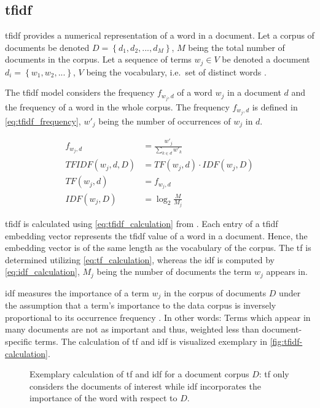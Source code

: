 \subsection{\acl*{tfidf}}\label{subsec:tfidf}

\acf{tfidf} provides a numerical representation of a word in a document.
Let a corpus of documents be denoted $D= \left\{d_1, d_2, ..., d_M  \right\}$, $M$ being the total number of documents in the corpus. 
Let a sequence of terms $w_{j} \in V$ be denoted a document $d_i = \left\{w_{1}, w_{2}, ...\right\}$, 
$V$ being the vocabulary, 
i.e.\ set of distinct words \cite{clusteringDocs2020}.

The \ac{tfidf} model considers the frequency $f_{w_{j}, d}$  of a word $w_{j}$ in a document $d$ and the frequency of a word in the whole corpus. 
The frequency $f_{w_{j}, d}$ is defined in \autoref{eq:tfidf_frequency}, $w'_j$ being the number of occurrences of $w_j$ in $d$.

\begin{align}
    f_{w_{j}, d} &= \frac{w'_{j}}{\sum_{k \in d} w'_k}\label{eq:tfidf_frequency}\\
    TFIDF(w_{j}, d, D) &= TF(w_{j}, d) \cdot IDF(w_{j}, D)\label{eq:tfidf_calculation}\\
    TF(w_{j}, d) &= f_{w_{j}, d}\label{eq:tf_calculation}\\
    IDF(w_{j}, D) &= \log_2\frac{M}{M_{j}}\label{eq:idf_calculation}
\end{align}

\ac{tfidf} is calculated using \autoref{eq:tfidf_calculation} from \cite{clusteringDocs2020}.
Each entry of a \ac{tfidf} embedding vector represents the \ac{tfidf} value of a word in a document.
Hence, the embedding vector is of the same length as the vocabulary of the corpus.
The \ac{tf} is determined utilizing \autoref{eq:tf_calculation}, 
whereas the \ac{idf} is computed by \autoref{eq:idf_calculation}, 
$M_{j}$ being the number of documents the term $w_{j}$ appears in.

\ac{idf} measures the importance of a term $w_{j}$ in the corpus of documents $D$
under the assumption that a term's importance to the data corpus is inversely proportional to its occurrence frequency \cite{tfidf2008}.
In other words: Terms which appear in many documents are not as important and thus, weighted less than document-specific terms. 
The calculation of \ac{tf} and \ac{idf} is visualized exemplary in \autoref{fig:tfidf-calculation}.


\begin{figure}[!htp] %
    \centering
    
    \caption[Exemplary calculation of \acs*{tf} and \acs*{idf} values]{
        Exemplary calculation of \acs*{tf} and \acs*{idf} for a document corpus $D$: 
        \acs*{tf} only considers the documents of interest while 
        \acs*{idf} incorporates the importance of the word with respect to $D$.
    }
    \label{fig:tfidf-calculation}
\end{figure}

